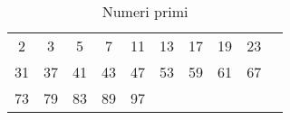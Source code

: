 \documentclass{article}
\begin{document}
\begin{longtable}{*{10}{c}}
\caption{Numeri primi}\label{tab:Numeri primi}
\endhead
\toprule
    2 &     3 &     5 &     7 &    11 &    13 &    17 &    19 &    23 & \\
   31 &    37 &    41 &    43 &    47 &    53 &    59 &    61 &    67 & \\
   73 &    79 &    83 &    89 &    97 &       &       &       &       & \\
\bottomrule
\end{longtable}
\end{document}
